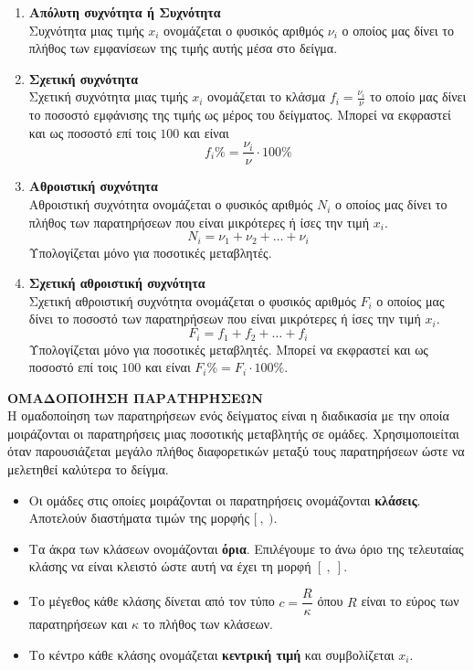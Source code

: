 \documentclass[twoside,11pt,a4paper,openany]{book}
\def\xrwma{red!70!black}
\newcounter{orismos}[chapter]
\renewcommand{\theorismos}{\arabic{orismos}}
\newcommand{\Orismos}[1]{\refstepcounter{orismos}{\textbf{\textbf{\textcolor{\xrwma}{{\large Ορισμός\hspace{2mm}\thechapter.\theorismos\;}:\;}}}}\hspace{1mm} \MakeUppercase{\textbf{#1}\\}}{}
\begin{document}
\begin{enumerate}[label=\bf\arabic*.,itemsep=0mm]
\item \textbf{Απόλυτη συχνότητα ή Συχνότητα}\\
Συχνότητα μιας τιμής $ x_i $ ονομάζεται ο φυσικός αριθμός $ \nu_i $ ο οποίος μας δίνει το πλήθος των εμφανίσεων της τιμής αυτής μέσα στο δείγμα.
\item \textbf{Σχετική συχνότητα}\\
Σχετική συχνότητα μιας τιμής $ x_i $ ονομάζεται το κλάσμα $ f_i=\frac{\nu_i}{\nu} $ το οποίο μας δίνει το ποσοστό εμφάνισης της τιμής ως μέρος του δείγματος. Μπορεί να εκφραστεί και ως ποσοστό επί τοις $ 100 $ και είναι \[ f_i\%=\frac{\nu_i}{\nu}\cdot 100\% \]
\item \textbf{Αθροιστική συχνότητα}\\
Αθροιστική συχνότητα ονομάζεται ο φυσικός αριθμός $ N_i $ ο οποίος μας δίνει το πλήθος των παρατηρήσεων που είναι μικρότερες ή ίσες την τιμή $ x_i $.
\[ N_i=\nu_1+\nu_2+\ldots+\nu_i \]
Υπολογίζεται μόνο για ποσοτικές μεταβλητές.
\item \textbf{Σχετική αθροιστική συχνότητα}\\
Σχετική αθροιστική συχνότητα ονομάζεται ο φυσικός αριθμός $ F_i $ ο οποίος μας δίνει το ποσοστό των παρατηρήσεων που είναι μικρότερες ή ίσες την τιμή $ x_i $.
\[ F_i=f_1+f_2+\ldots+f_i \]
Υπολογίζεται μόνο για ποσοτικές μεταβλητές. Μπορεί να εκφραστεί και ως ποσοστό επί τοις $ 100 $ και είναι $ F_i\%=F_i\cdot 100\% $.
\end{enumerate}
\Orismos{Ομαδοποίηση παρατηρήσεων}
Η ομαδοποίηση των παρατηρήσεων ενός δείγματος είναι η διαδικασία με την οποία μοιράζονται οι παρατηρήσεις μιας ποσοτικής μεταβλητής σε ομάδες. Χρησιμοποιείται όταν παρουσιάζεται μεγάλο πλήθος διαφορετικών μεταξύ τους παρατηρήσεων ώστε να μελετηθεί καλύτερα το δείγμα.
\begin{itemize}
\item Οι ομάδες στις οποίες μοιράζονται οι παρατηρήσεις ονομάζονται \textbf{κλάσεις}. Αποτελούν διαστήματα τιμών της μορφής $ [\ ,\ ) $.
\item Τα άκρα των κλάσεων ονομάζονται \textbf{όρια}. Επιλέγουμε το άνω όριο της τελευταίας κλάσης να είναι κλειστό ώστε αυτή να έχει τη μορφή $ [\ ,\ ] $.
\item Το μέγεθος κάθε κλάσης δίνεται από τον τύπο $ c=\dfrac{R}{\kappa} $ όπου $ R $ είναι το εύρος των παρατηρήσεων και $ \kappa $ το πλήθος των κλάσεων.
\item Το κέντρο κάθε κλάσης ονομάζεται \textbf{κεντρική τιμή} και συμβολίζεται $ x_i $.
\end{itemize}
\end{document}
